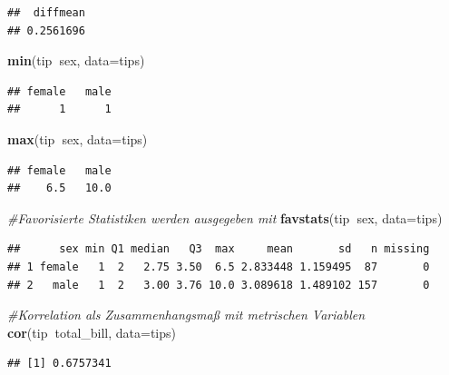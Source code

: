 \documentclass[10pt,ngerman,onside]{article}
\newenvironment{Shaded}{\begin{snugshade}}{\end{snugshade}}
\newcommand{\KeywordTok}[1]{\textcolor[rgb]{0.13,0.29,0.53}{\textbf{#1}}}
\newcommand{\DataTypeTok}[1]{\textcolor[rgb]{0.13,0.29,0.53}{#1}}
\newcommand{\CommentTok}[1]{\textcolor[rgb]{0.56,0.35,0.01}{\textit{#1}}}
\newcommand{\OperatorTok}[1]{\textcolor[rgb]{0.81,0.36,0.00}{\textbf{#1}}}
\newcommand{\NormalTok}[1]{#1}
\begin{document}
\begin{verbatim}
##  diffmean 
## 0.2561696
\end{verbatim}

\begin{Shaded}
\begin{Highlighting}[]
\KeywordTok{min}\NormalTok{(tip}\OperatorTok{~}\NormalTok{sex, }\DataTypeTok{data=}\NormalTok{tips)}
\end{Highlighting}
\end{Shaded}

\begin{verbatim}
## female   male 
##      1      1
\end{verbatim}

\begin{Shaded}
\begin{Highlighting}[]
\KeywordTok{max}\NormalTok{(tip}\OperatorTok{~}\NormalTok{sex, }\DataTypeTok{data=}\NormalTok{tips)}
\end{Highlighting}
\end{Shaded}

\begin{verbatim}
## female   male 
##    6.5   10.0
\end{verbatim}

\begin{Shaded}
\begin{Highlighting}[]
\CommentTok{#Favorisierte Statistiken werden ausgegeben mit}
\KeywordTok{favstats}\NormalTok{(tip}\OperatorTok{~}\NormalTok{sex, }\DataTypeTok{data=}\NormalTok{tips)}
\end{Highlighting}
\end{Shaded}

\begin{verbatim}
##      sex min Q1 median   Q3  max     mean       sd   n missing
## 1 female   1  2   2.75 3.50  6.5 2.833448 1.159495  87       0
## 2   male   1  2   3.00 3.76 10.0 3.089618 1.489102 157       0
\end{verbatim}

\begin{Shaded}
\begin{Highlighting}[]
\CommentTok{#Korrelation als Zusammenhangsmaß mit metrischen Variablen}
\KeywordTok{cor}\NormalTok{(tip}\OperatorTok{~}\NormalTok{total_bill, }\DataTypeTok{data=}\NormalTok{tips)}
\end{Highlighting}
\end{Shaded}

\begin{verbatim}
## [1] 0.6757341
\end{verbatim}
\end{document}
